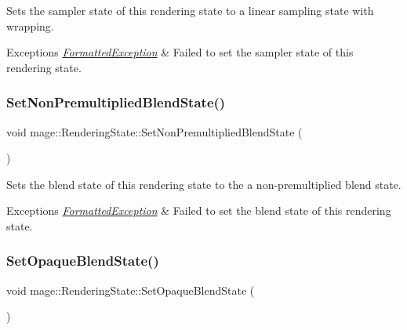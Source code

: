 Sets the sampler state of this rendering state to a linear sampling state with wrapping.


\begin{DoxyExceptions}{Exceptions}
{\em \hyperlink{structmage_1_1_formatted_exception}{Formatted\+Exception}} & Failed to set the sampler state of this rendering state. \\
\hline
\end{DoxyExceptions}
\hypertarget{structmage_1_1_rendering_state_acf313a797964e3a86dde2799a42f2db3}{}\label{structmage_1_1_rendering_state_acf313a797964e3a86dde2799a42f2db3} 
\subsubsection{\texorpdfstring{Set\+Non\+Premultiplied\+Blend\+State()}{SetNonPremultipliedBlendState()}}
{\footnotesize\ttfamily void mage\+::\+Rendering\+State\+::\+Set\+Non\+Premultiplied\+Blend\+State (\begin{DoxyParamCaption}{ }\end{DoxyParamCaption})}

Sets the blend state of this rendering state to the a non-\/premultiplied blend state.


\begin{DoxyExceptions}{Exceptions}
{\em \hyperlink{structmage_1_1_formatted_exception}{Formatted\+Exception}} & Failed to set the blend state of this rendering state. \\
\hline
\end{DoxyExceptions}
\hypertarget{structmage_1_1_rendering_state_ab0f578405f3c880234757e152be1a670}{}\label{structmage_1_1_rendering_state_ab0f578405f3c880234757e152be1a670} 
\subsubsection{\texorpdfstring{Set\+Opaque\+Blend\+State()}{SetOpaqueBlendState()}}
{\footnotesize\ttfamily void mage\+::\+Rendering\+State\+::\+Set\+Opaque\+Blend\+State (\begin{DoxyParamCaption}{ }\end{DoxyParamCaption})}


